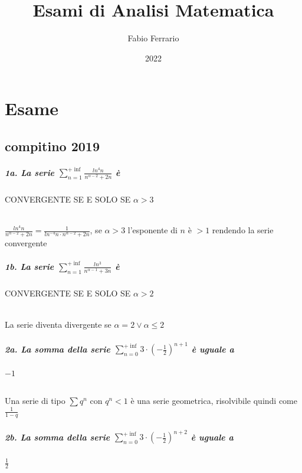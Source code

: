 \documentclass[12pt, a4paper, openany]{book}
\begin{document}
\title{Esami di Analisi Matematica}
\author{Fabio Ferrario}
\date{2022}
\maketitle

\tableofcontents
\chapter{Esame}
\section{compitino 2019}
\paragraph{1a. La serie $\sum^{+\inf}_{n=1} \frac{ln^4n}{n^{\alpha - 2} + 2n}$ è} CONVERGENTE SE E SOLO SE $\alpha > 3$
\subparagraph{}
$\frac{ln^4n}{n^{\alpha - 2} + 2n} = \frac{1}{ln^{-4}n\cdot n^{\alpha-2}+2n} $,  se $\alpha >3$ l'esponente di $n$ è $>1$ rendendo la serie convergente

\paragraph{1b. La serie $\sum^{+\inf}_{n=1} \frac{ln^3}{n^{\alpha - 1} + 3n}$ è} CONVERGENTE SE E SOLO SE $\alpha > 2$
\subparagraph{} La serie diventa divergente se $\alpha = 2 \lor \alpha \leq 2$

\paragraph{2a. La somma della serie $\sum^{+\inf}_{n=0} 3\cdot (-\frac{1}{2})^{n+1}$ è uguale a} $-1$
\subparagraph{}
Una serie di tipo $\sum q^n$ con $q^n < 1$ è una serie geometrica, risolvibile quindi come $\frac{1}{1-q}$
\paragraph{2b. La somma della serie $\sum^{+\inf}_{n=0} 3\cdot (-\frac{1}{2})^{n+2}$ è uguale a} $\frac{1}{2}$
\end{document}
